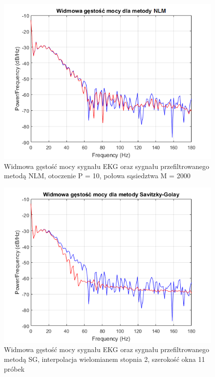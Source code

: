 \begin{figure}[H]
  \begin{center}
    \includegraphics[scale=0.9]
    {img/PSD_NLM_250.png}
  \end{center}
  \caption{Widmowa gęstość mocy sygnału EKG oraz sygnału przefiltrowanego metodą NLM, otoczenie P = 10, połowa sąsiedztwa M = 2000}
  \label{rys:nlm}
\end{figure}

\begin{figure}[H]
  \begin{center}
    \includegraphics[scale=0.9]
    {img/PSD_SG_M5.png}
  \end{center}
  \caption{Widmowa gęstość mocy sygnału EKG oraz sygnału przefiltrowanego metodą SG, interpolacja wielomianem stopnia 2, szerokość okna 11 próbek}
  \label{rys:sg}
\end{figure}

